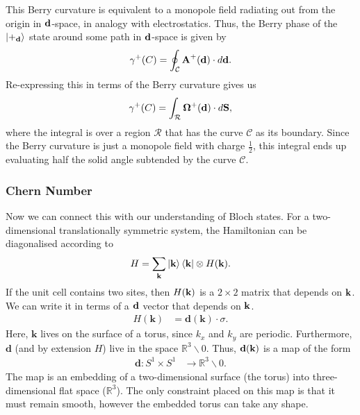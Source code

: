 This Berry curvature is equivalent to a monopole field radiating out from the origin in $\textbf d$-space, in analogy with electrostatics. Thus, the Berry phase of the $\ket{+_{\textbf d}}$ state around some path in $\textbf d$-space is given by
\begin{align}
	\gamma^+ (C) = \oint_{\mathcal C} \textbf A^+ (\textbf d) \cdot d \textbf d.
\end{align}
Re-expressing this in terms of the Berry curvature gives us
\begin{align}
	\gamma^+ (C) = \int_{\mathcal R} \bm \Omega^+ (\textbf d) \cdot d \textbf S,
\end{align}
where the integral is over a region $\mathcal R$ that has the curve $\mathcal C$ as its boundary. Since the Berry curvature is just a monopole field with charge $\frac{1}{2}$, this integral ends up evaluating half the solid angle subtended by the curve $\mathcal C$.

\subsubsection{Chern Number}
Now we can connect this with our understanding of Bloch states. For a two-dimensional translationally symmetric system, the Hamiltonian can be diagonalised according to
\begin{align}
	 H = \sum_{\textbf k} \ket{\textbf k}\bra{\textbf k} \otimes  H (\textbf k).
\end{align}
If the unit cell contains two sites, then $ H (\textbf k)$ is a $2 \times 2$ matrix that depends on $\textbf k$. We can write it in terms of a $\textbf d$ vector that depends on $\textbf k$.
\begin{align}
H(\textbf{k}) &= \textbf{d}(\textbf{k})\cdot {\sigma}.
\end{align}
Here, $\textbf{k}$ lives on the surface of a torus, since $k_x$ and $k_y$ are periodic. Furthermore, $\textbf{d}$ (and by extension $ H$) live in the space $\mathbb{R}^3\backslash 0$. Thus, $\textbf{d} ( \textbf k )$ is a map of the form
\begin{align}
    \textbf{d} : S^1 \times S^1 &\rightarrow \mathbb{R}^3\backslash 0 .
\end{align}
The map is an embedding of a two-dimensional surface (the torus) into three-dimensional flat space ($\mathbb{R}^3$). The only constraint placed on this map is that it must remain smooth, however the embedded torus can take any shape.

